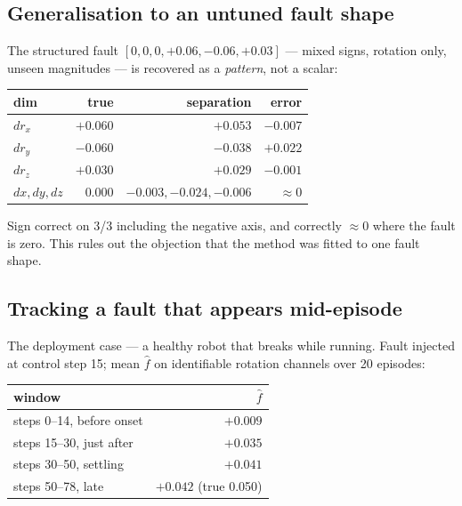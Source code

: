 \documentclass[11pt,a4paper]{article}
\newcommand{\fhat}{\hat{f}}
\begin{document}
\subsection{Generalisation to an untuned fault shape}

The structured fault $[0,0,0,+0.06,-0.06,+0.03]$ --- mixed signs, rotation only,
unseen magnitudes --- is recovered as a \emph{pattern}, not a scalar:

\begin{center}
\begin{tabular}{lrrr}
\toprule
\textbf{dim} & \textbf{true} & \textbf{separation} & \textbf{error} \\
\midrule
$d r_x$ & $+0.060$ & $+0.053$ & $-0.007$ \\
$d r_y$ & $-0.060$ & $-0.038$ & $+0.022$ \\
$d r_z$ & $+0.030$ & $+0.029$ & $-0.001$ \\
$dx, dy, dz$ & $0.000$ & $-0.003, -0.024, -0.006$ & $\approx 0$ \\
\bottomrule
\end{tabular}
\end{center}

Sign correct on 3/3 including the negative axis, and correctly $\approx 0$ where
the fault is zero. This rules out the objection that the method was fitted to one
fault shape.

\subsection{Tracking a fault that appears mid-episode}

The deployment case --- a healthy robot that breaks while running. Fault injected
at control step 15; mean $\fhat$ on identifiable rotation channels over 20
episodes:

\begin{center}
\begin{tabular}{lr}
\toprule
\textbf{window} & $\fhat$ \\
\midrule
steps 0--14, before onset & $\mathbf{+0.009}$ \\
steps 15--30, just after  & $+0.035$ \\
steps 30--50, settling    & $+0.041$ \\
steps 50--78, late        & $\mathbf{+0.042}$ (true 0.050) \\
\bottomrule
\end{tabular}
\end{center}
\end{document}

